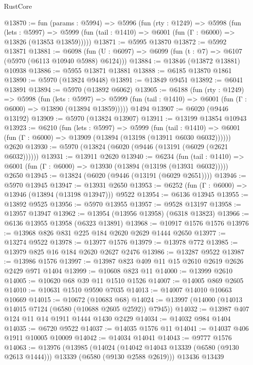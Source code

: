 \begin{lexlean}{RustCore}
\begin{coremodule}
@13870 := fun (params : @5994) =>
  @5996
    (fun (rty : @1249) =>
    @5998
      (fun (lets : @5997) =>
      @5999 (fun (tail : @1410) => @6001 (fun (Γ : @6000) => @13826 (@13853 @13859)))))
@13871 := @5995 @13870
@13872 := @5992 @13871
@13881 := @6098
    (fun (U : @6097) => @6099 (fun (t : @7) => @6107 (@5970 (@6113 @10940 @5988) @6124)))
@13884 := @13846 (@13872 @13881) @10938
@13886 := @5955 @13871 @13881
@13888 := @6185 @13870 @1861
@13890 := @5970 (@13824 @9448)
@13891 := @13849 @9451
@13892 := @6041 @13891
@13894 := @5970 (@13892 @6062)
@13905 := @6188
    (fun (rty : @1249) =>
    @5998
      (fun (lets : @5997) =>
      @5999 (fun (tail : @1410) => @6001 (fun (Γ : @6000) => @13890 (@13894 @13859)))))
    @1494
@13907 := @6020 (@9446 @13192)
@13909 := @5970 (@13824 @13907)
@13911 := @13199 @13854 @10943
@13923 := @6210
    (fun (lets : @5997) =>
    @5999
      (fun (tail : @1410) =>
      @6001 (fun (Γ : @6000) => @13909 (@13894 (@13198 (@13911 @6030 @6032))))))
    @2620
@13930 := @5970 (@13824 (@6020 (@9446 (@13191 (@6029 (@2621 @6032))))))
@13931 := @13911 @2620
@13940 := @6234
    (fun (tail : @1410) => @6001 (fun (Γ : @6000) => @13930 (@13894 (@13198 (@13931 @6032)))))
    @2650
@13945 := @13824 (@6020 (@9446 (@13191 (@6029 @2651))))
@13946 := @5970 @13945
@13947 := @13931 @2650
@13953 := @6252 (fun (Γ : @6000) => @13946 (@13894 (@13198 @13947))) @9522
@13954 := @6136 @13945
@13955 := @13892 @9525
@13956 := @5970 @13955
@13957 := @9528 @13197
@13958 := @13957 @13947
@13962 := @13954 (@13956 @13958) (@6318 @13823)
@13966 := @6136 @13955 @13958 (@6323 @13891)
@13968 := @10917 @1576 @1576
@13976 := @13968 @826 @831 @225 @184 @2620 @2629 @1444 @2650
@13977 := @13274 @9522
@13978 := @13977 @1576
@13979 := @13978 @772
@13985 := @13979 @825 @16 @184 @2620 @2627 @2476
@13986 := @13287 @9522
@13987 := @13986 @1576
@13997 := @13987 @823 @409 @11 @15 @2610 @2619 @2626 @2429 @971 @1404
@13999 := @10608 @823 @11
@14000 := @13999 @2610
@14005 := @10620 @68 @39 @11 @1510 @1526
@14007 := @14005 @869 @2605
@14010 := @10631 @1510 @9590 @7035
@14013 := @14007 @14010 @10663 @10669
@14015 := @10672 (@10683 @68)
@14024 := @13997 (@14000 (@14013 @14015 @7124 (@6580 (@10688 @2605 @2592)) @7945))
@14032 := @13987 @407 @124 @11 @14 @1911 @1444 @1430 @2429
@14034 := @14032 @984 @1404
@14035 := @6720 @9522
@14037 := @14035 @1576 @11
@14041 := @14037 @406 @1911 @10005 @10009
@14042 := @14034 @14041
@14043 := @9777 @1576
@14063 := @13976
    (@13985
      (@14024 (@14042 @14043 @13339 (@6580 (@9130 @2613 @1444))) @13339 (@6580 (@9130 @2588 @2619)))
      @13436
      @13439

\end{coremodule}
\end{lexlean}
